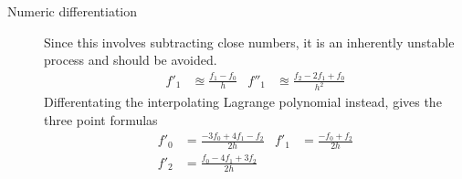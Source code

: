 \begin{description}
    \item[Numeric differentiation] Since this involves subtracting close numbers, it is
        an inherently unstable process and should be avoided.
        \begin{align}
            f'_1  & \approxeq \frac{f_1 - f_0}{h}          &
            f''_1 & \approxeq \frac{f_2 - 2f_1 + f_0}{h^2}
        \end{align}
        Differentating the interpolating Lagrange polynomial instead, gives the three
        point formulas
        \begin{align}
            f'_0 & = \frac{-3f_0 + 4f_1 - f_2}{2h} &
            f'_1 & = \frac{-f_0 + f_2}{2h}           \\
            f'_2 & = \frac{f_0 - 4f_1 + 3f_2}{2h}
        \end{align}

\end{description}